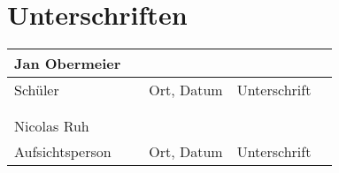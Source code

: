 \section{Unterschriften}
\begin{center}
\begin{tabular}{ l l l l l}
Jan Obermeier\\
\hline
\scriptsize Schüler& \qquad &\scriptsize  Ort, Datum \hspace{3cm} &\scriptsize  Unterschrift& \hspace*{4cm}\\
\\
\\
Nicolas Ruh\\
\hline
\scriptsize Aufsichtsperson& \qquad &\scriptsize  Ort, Datum \hspace{3cm} &\scriptsize  Unterschrift& \hspace*{4cm}\\
\end{tabular}
\end{center} 



	
	
	
	
	
	
	
	
	
	






